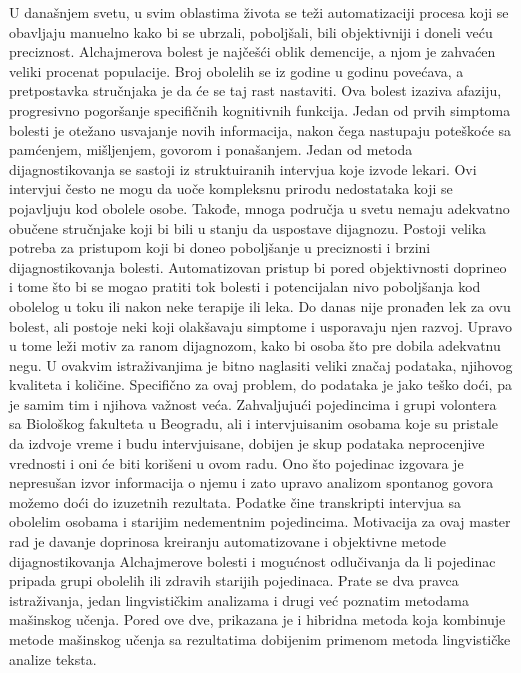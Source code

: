 \documentclass[12pt,oneside]{memoir}
\begin{document}
U današnjem svetu, u svim oblastima života se teži automatizaciji procesa koji se obavljaju manuelno kako bi se ubrzali, poboljšali, bili objektivniji i doneli veću preciznost.  Alchajmerova bolest je najčešći oblik demencije, a njom je zahvaćen veliki procenat populacije. Broj obolelih se iz godine u godinu povećava, a pretpostavka stručnjaka je da će se taj rast nastaviti. Ova bolest izaziva afaziju, progresivno pogoršanje specifičnih kognitivnih funkcija.  Jedan od prvih simptoma bolesti je otežano usvajanje novih informacija, nakon čega nastupaju poteškoće sa pamćenjem, mišljenjem, govorom i ponašanjem. Jedan od metoda dijagnostikovanja se sastoji iz struktuiranih intervjua koje izvode lekari.  Ovi intervjui često ne mogu da uoče kompleksnu prirodu nedostataka koji se pojavljuju kod obolele osobe.  Takođe, mnoga područja u svetu nemaju adekvatno obučene stručnjake koji bi bili u stanju da uspostave dijagnozu.  
Postoji velika potreba za pristupom koji bi doneo poboljšanje u preciznosti i brzini dijagnostikovanja bolesti.  Automatizovan pristup bi pored objektivnosti doprineo i tome što bi se mogao pratiti tok bolesti i potencijalan nivo poboljšanja kod obolelog u toku ili nakon neke terapije ili leka.  Do danas nije pronađen lek za ovu bolest, ali postoje neki koji olakšavaju simptome i usporavaju njen razvoj.  Upravo u tome leži motiv za ranom dijagnozom, kako bi osoba što pre dobila adekvatnu negu.  
U ovakvim istraživanjima je bitno naglasiti veliki značaj podataka, njihovog kvaliteta i količine. Specifično za ovaj problem, do podataka je jako teško doći, pa je samim tim i njihova važnost veća. Zahvaljujući pojedincima i grupi volontera sa Biološkog fakulteta u Beogradu, ali i intervjuisanim osobama koje su pristale da izdvoje vreme i budu intervjuisane, dobijen je skup podataka neprocenjive vrednosti i oni će biti korišeni u ovom radu. 
\newpage
\noindent
Ono što pojedinac izgovara je nepresušan izvor informacija o njemu i zato upravo analizom spontanog govora možemo doći do izuzetnih rezultata.  Podatke čine transkripti intervjua sa obolelim osobama i starijim nedementnim pojedincima. 
Motivacija za ovaj master rad je davanje doprinosa kreiranju automatizovane i objektivne metode dijagnostikovanja Alchajmerove bolesti i mogućnost odlučivanja da li pojedinac pripada grupi obolelih ili zdravih starijih pojedinaca.  Prate se dva pravca istraživanja, jedan lingvističkim analizama i drugi već poznatim metodama mašinskog učenja.  Pored ove dve, prikazana je i hibridna metoda koja kombinuje metode mašinskog učenja sa rezultatima dobijenim primenom metoda lingvističke analize teksta. 
\end{document}
